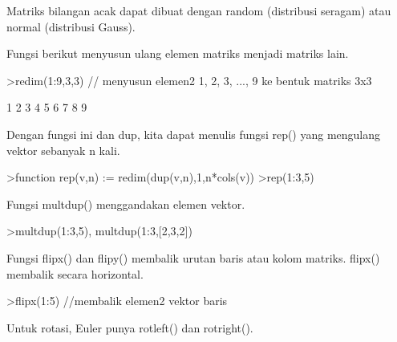 \documentclass[a4paper,10pt]{article}
\begin{document}
\begin{eulernotebook}
\begin{eulercomment}
\begin{eulercomment}
\begin{eulercomment}
\begin{eulercomment}
\begin{eulercomment}
\begin{eulercomment}
\begin{eulercomment}
\begin{eulercomment}
\begin{eulercomment}
\begin{eulercomment}
\begin{eulercomment}
\begin{eulercomment}
\begin{eulercomment}
\begin{eulercomment}
\begin{eulercomment}
Matriks bilangan acak dapat dibuat dengan random (distribusi seragam) atau
normal (distribusi Gauss).

Fungsi berikut menyusun ulang elemen matriks menjadi matriks lain.
\end{eulercomment}
\begin{eulerprompt}
>redim(1:9,3,3) // menyusun elemen2 1, 2, 3, ..., 9 ke bentuk matriks 3x3
\end{eulerprompt}
\begin{euleroutput}
              1             2             3 
              4             5             6 
              7             8             9 
\end{euleroutput}
\begin{eulercomment}
Dengan fungsi ini dan dup, kita dapat menulis fungsi rep() yang mengulang
vektor sebanyak n kali.
\end{eulercomment}
\begin{eulerprompt}
>function rep(v,n) := redim(dup(v,n),1,n*cols(v))
>rep(1:3,5)
\end{eulerprompt}
\begin{euleroutput}
  [1,  2,  3,  1,  2,  3,  1,  2,  3,  1,  2,  3,  1,  2,  3]
\end{euleroutput}
\begin{eulercomment}
Fungsi multdup() menggandakan elemen vektor.
\end{eulercomment}
\begin{eulerprompt}
>multdup(1:3,5), multdup(1:3,[2,3,2])
\end{eulerprompt}
\begin{euleroutput}
  [1,  1,  1,  1,  1,  2,  2,  2,  2,  2,  3,  3,  3,  3,  3]
  [1,  1,  2,  2,  2,  3,  3]
\end{euleroutput}
\begin{eulercomment}
Fungsi flipx() dan flipy() membalik urutan baris atau kolom matriks.
flipx() membalik secara horizontal.
\end{eulercomment}
\begin{eulerprompt}
>flipx(1:5) //membalik elemen2 vektor baris
\end{eulerprompt}
\begin{euleroutput}
  [5,  4,  3,  2,  1]
\end{euleroutput}
\begin{eulercomment}
Untuk rotasi, Euler punya rotleft() dan rotright().
\end{eulercomment}
\begin{eulerprompt}

\end{eulerprompt}
\end{eulercomment}
\end{eulercomment}
\end{eulercomment}
\end{eulercomment}
\end{eulercomment}
\end{eulercomment}
\end{eulercomment}
\end{eulercomment}
\end{eulercomment}
\end{eulercomment}
\end{eulercomment}
\end{eulercomment}
\end{eulercomment}
\end{eulercomment}
\end{eulernotebook}
\end{document}
